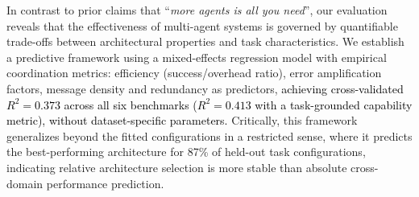 In contrast to prior claims that ``\textit{more agents is all you need}'', our evaluation reveals that the effectiveness of multi-agent systems is governed by quantifiable trade-offs between architectural properties and task characteristics. We establish a predictive framework using a mixed-effects regression model with empirical coordination metrics: efficiency (success/overhead ratio), error amplification factors, message density and redundancy as predictors, \textcolor{black}{achieving cross-validated $R^2{=}0.373$ across all six benchmarks ($R^2{=}0.413$ with a task-grounded capability metric), without dataset-specific parameters.} Critically, this framework generalizes beyond the fitted configurations in a restricted sense, where it predicts the best-performing architecture for 87\% of held-out task configurations, indicating relative architecture selection is more stable than absolute cross-domain performance prediction.

